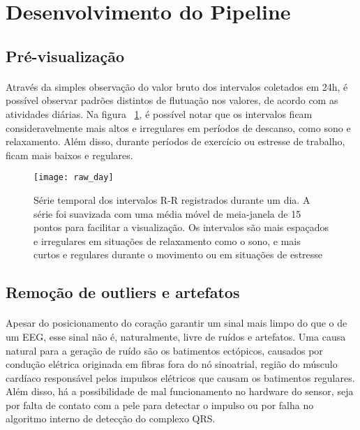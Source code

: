 
    \section{Desenvolvimento do Pipeline}
    \label{Pipeline}
    
        \subsection{Pré-visualização}        
        
            \paragraph{} Através da simples observação do valor bruto dos intervalos coletados em 24h, é possível observar padrões distintos de flutuação nos valores, de acordo com as atividades diárias. Na figura ~\ref{raw_day}, é possível notar que os intervalos ficam consideravelmente mais altos e irregulares em períodos de descanso, como sono e relaxamento. Além disso, durante períodos de exercício ou estresse de trabalho, ficam mais baixos e regulares. 
        
            \begin{figure}[h!]
            	\centering
            	\texttt{[image: raw\_day]}
            	\caption{Série temporal dos intervalos R-R registrados durante um dia. A série foi suavizada com uma média móvel de meia-janela de 15 pontos para facilitar a visualização. Os intervalos são mais espaçados e irregulares em situações de relaxamento como o sono, e mais curtos e regulares durante o movimento ou em situações de estresse}
                \label{raw_day}
            \end{figure}
        
        \subsection{Remoção de outliers e artefatos}
        
            \paragraph{} Apesar do posicionamento do coração garantir um sinal mais limpo do que o de um EEG, esse sinal não é, naturalmente, livre de ruídos e artefatos. Uma causa natural para a geração de ruído são os batimentos ectópicos, causados por condução elétrica originada em fibras fora do nó sinoatrial, região do músculo cardíaco responsável pelos impulsos elétricos que causam os batimentos regulares. Além disso, há a possibilidade de mal funcionamento no hardware do sensor, seja por falta de contato com a pele para detectar o impulso ou por falha no algoritmo interno de detecção do complexo QRS. 
            
